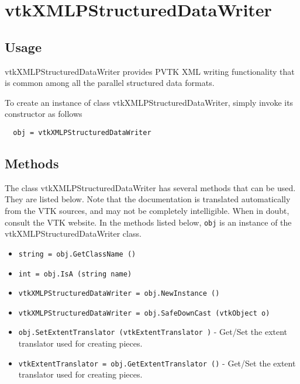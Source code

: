 \section{vtkXMLPStructuredDataWriter}

\subsection{Usage}

 vtkXMLPStructuredDataWriter provides PVTK XML writing functionality
 that is common among all the parallel structured data formats.

To create an instance of class vtkXMLPStructuredDataWriter, simply
invoke its constructor as follows
\begin{verbatim}
  obj = vtkXMLPStructuredDataWriter
\end{verbatim}
\subsection{Methods}

The class vtkXMLPStructuredDataWriter has several methods that can be used.
  They are listed below.
Note that the documentation is translated automatically from the VTK sources,
and may not be completely intelligible.  When in doubt, consult the VTK website.
In the methods listed below, \verb|obj| is an instance of the vtkXMLPStructuredDataWriter class.
\begin{itemize}
\item  \verb|string = obj.GetClassName ()|

\item  \verb|int = obj.IsA (string name)|

\item  \verb|vtkXMLPStructuredDataWriter = obj.NewInstance ()|

\item  \verb|vtkXMLPStructuredDataWriter = obj.SafeDownCast (vtkObject o)|

\item  \verb|obj.SetExtentTranslator (vtkExtentTranslator )| -  Get/Set the extent translator used for creating pieces.

\item  \verb|vtkExtentTranslator = obj.GetExtentTranslator ()| -  Get/Set the extent translator used for creating pieces.

\end{itemize}
